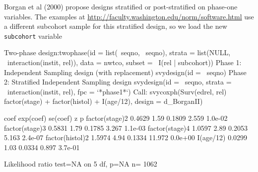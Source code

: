 \documentclass{article}
\begin{document}
Borgan et al (2000) propose designs stratified or post-stratified on
phase-one variables. The examples at
\url{http://faculty.washington.edu/norm/software.html} use a different
subcohort sample for this stratified design, so we load the new
\texttt{subcohort} variable
\begin{Schunk}
\begin{Soutput}
Two-phase design:twophase(id = list(~seqno, ~seqno), strata = list(NULL, ~interaction(instit, 
    rel)), data = nwtco, subset = ~I(rel | subcohort))
Phase 1:
Independent Sampling design (with replacement)
svydesign(id = ~seqno)
Phase 2:
Stratified Independent Sampling design
svydesign(id = ~seqno, strata = ~interaction(instit, rel), fpc = `*phase1*`)
Call:
svycoxph(Surv(edrel, rel) ~ factor(stage) + factor(histol) + 
    I(age/12), design = d_BorganII)


                  coef exp(coef) se(coef)      z       p
factor(stage)2  0.4629      1.59   0.1809  2.559 1.0e-02
factor(stage)3  0.5831      1.79   0.1785  3.267 1.1e-03
factor(stage)4  1.0597      2.89   0.2053  5.163 2.4e-07
factor(histol)2 1.5974      4.94   0.1334 11.972 0.0e+00
I(age/12)       0.0299      1.03   0.0334  0.897 3.7e-01

Likelihood ratio test=NA  on 5 df, p=NA  n= 1062 
\end{Soutput}
\end{Schunk}
\end{document}

